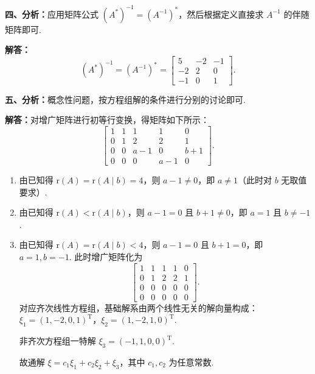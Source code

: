 \documentclass[a4paper,11pt]{ctexart}
\newcommand{\rk}{\mathrm{r}}
\newcommand{\T}{\mathrm{T}}
\begin{document}
\vspace{0.8em}

\textbf{四、分析：}应用矩阵公式 $(A^*)^{-1} = (A^{-1})^*$，然后根据定义直接求 $A^{-1}$ 的伴随矩阵即可.

\textbf{解答：}
\[
  (A^*)^{-1} = (A^{-1})^* = \begin{bmatrix}
    5 & -2 & -1 \\
    -2 & 2 & 0 \\
    -1 & 0 & 1
  \end{bmatrix}.
\]

\vspace{0.8em}

\textbf{五、分析：}概念性问题，按方程组解的条件进行分别的讨论即可.

\textbf{解答：}对增广矩阵进行初等行变换，得矩阵如下所示：
\[
  \begin{bmatrix}
    1 & 1 & 1 & 1 & 0 \\
    0 & 1 & 2 & 2 & 1 \\
    0 & 0 & a-1 & 0 & b+1 \\
    0 & 0 & 0 & a-1 & 0
  \end{bmatrix}.
\]
\begin{enumerate}[label=\arabic*., leftmargin=2em, itemsep=0.4em, topsep=0.3em]
  \item 由已知得 $\rk(A) = \rk(A \mid b) = 4$，则 $a - 1 \neq 0$，即 $a \neq 1$（此时对 $b$ 无取值要求）.
  \item 由已知得 $\rk(A) < \rk(A \mid b)$，则 $a - 1 = 0$ 且 $b + 1 \neq 0$，即 $a = 1$ 且 $b \neq -1$.
  \item 由已知得 $\rk(A) = \rk(A \mid b) < 4$，则 $a - 1 = 0$ 且 $b + 1 = 0$，即 $a = 1, b = -1$. 此时增广矩阵化为
  \[
    \begin{bmatrix}
      1 & 1 & 1 & 1 & 0 \\
      0 & 1 & 2 & 2 & 1 \\
      0 & 0 & 0 & 0 & 0 \\
      0 & 0 & 0 & 0 & 0
    \end{bmatrix}.
  \]
  对应齐次线性方程组，基础解系由两个线性无关的解向量构成：\\
  $\xi_1 = (1, -2, 0, 1)^{\T}$，$\xi_2 = (1, -2, 1, 0)^{\T}$.

  非齐次方程组一特解 $\xi_3 = (-1, 1, 0, 0)^{\T}$.

  故通解 $\xi = c_1 \xi_1 + c_2 \xi_2 + \xi_3$，其中 $c_1, c_2$ 为任意常数.
\end{enumerate}

\vspace{0.8em}
\end{document}
